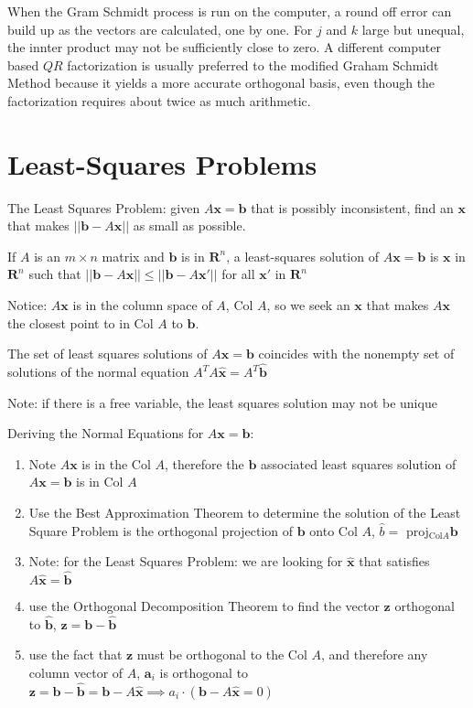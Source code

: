 \documentclass[../linalg.tex]{subfiles}
\begin{document}
When the Gram Schmidt process is run on the computer, a round off error can build up as the vectors are calculated, one by one. For $j$ and $k$ large but unequal, the innter product may not be sufficiently close to zero.
A different computer based $QR$ factorization is usually preferred to the modified Graham Schmidt Method because it yields a more accurate orthogonal basis, even though the factorization requires about twice as much arithmetic.

\section{Least-Squares Problems}
The Least Squares Problem: given $A\textbf{x}=\textbf{b}$ that is possibly inconsistent, find an $\textbf{x}$ that makes $||\textbf{b}-A\textbf{x}||$ as small as possible.
\begin{definition}
    If $A$ is an $m\times n$ matrix and $\textbf{b}$ is in $\textbf{R}^n$, a least-squares solution of $A\textbf{x}=\textbf{b}$ is $\textbf{x}$ in $\textbf{R}^n$ such that 
    $||\textbf{b}-A\textbf{x}||\leq ||\textbf{b}-A\textbf{x}'||$ for all $\textbf{x}'$ in $\textbf{R}^n$
\end{definition}
Notice: $A\textbf{x}$ is in the column space of $A$, Col $A$, so we seek an $\textbf{x}$ that makes $A\textbf{x}$ the closest point to in Col $A$ to $\textbf{b}$.
\begin{theorem}
    The set of least squares solutions of $A\textbf{x}=\textbf{b}$ coincides with the nonempty set of solutions of the normal equation $A^TA\hat{\textbf{x}}=A^T\hat{\textbf{b}}$
\end{theorem}

Note: if there is a free variable, the least squares solution may not be unique 

Deriving the Normal Equations for $A\textbf{x}=\textbf{b}$:
\begin{enumerate}
    \item Note $A\textbf{x}$ is in the Col $A$, therefore the $\textbf{b}$ associated least squares solution of $A\textbf{x}=\textbf{b}$ is in Col $A$
    \item Use the Best Approximation Theorem to determine the solution of the Least Square Problem is the orthogonal projection of $\textbf{b}$ onto Col $A$, $\hat{b}=$ proj$_{\text{Col} A}\textbf{b}$
    \item Note: for the Least Squares Problem: we are looking for $\hat{\textbf{x}}$ that satisfies $A\hat{\textbf{x}}=\hat{\textbf{b}}$
    \item use the Orthogonal Decomposition Theorem to find the vector $\textbf{z}$ orthogonal to $\hat{\textbf{b}}$, $\textbf{z}=\textbf{b}-\hat{\textbf{b}}$
    \item use the fact that $\textbf{z}$ must be orthogonal to the Col $A$, and therefore any column vector of $A$, $\textbf{a}_i$ is orthogonal to $\textbf{z}=\textbf{b}-\hat{\textbf{b}}=\textbf{b}-A\hat{\textbf{x}} \implies a_i\cdot (\textbf{b}-A\hat{\textbf{x}}=0)$
\end{enumerate}
\end{document}

